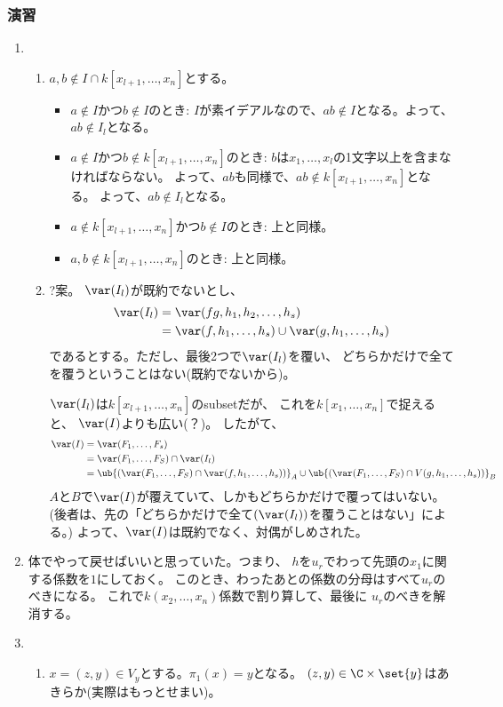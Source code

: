 \subsubsection{演習}
\label{subs:演習}
\begin{enumerate}[label=(\arabic*)]
  \item
  \begin{enumerate}[label=(\alph*)]
    \item
    $a,b \notin I\cap k[x_{l+1},\dots,x_n]$とする。
    \begin{itemize}
      \item $a\notin I$かつ$b\notin I$のとき:
      $I$が素イデアルなので、$ab \notin I$となる。よって、
      $ab \notin I_l$となる。
      \item $a\notin I$かつ$b\notin k[x_{l+1},\dots,x_n]$のとき:
      $b$は$x_1,\dots,x_l$の1文字以上を含まなければならない。
      よって、$ab$も同様で、$ab\notin k[x_{l+1},\dots,x_n]$となる。
      よって、$ab\notin I_l$となる。
      \item $a\notin k[x_{l+1},\dots,x_n]$かつ$b\notin I$のとき:
      上と同様。
      \item $a,b \notin k[x_{l+1},\dots,x_n]$のとき:
      上と同様。
    \end{itemize}
    \item
    ?案。
    $\var(I_l)$が既約でないとし、
    \begin{align}
      \var(I_l) &= \var(fg,h_1,h_2,\dots,h_s)\\
      &=
      \var(f,h_1,\dots,h_s) \cup \var(g,h_1,\dots,h_s)
    \end{align}
    であるとする。ただし、最後2つで$\var(I_l)$を覆い、
    どちらかだけで全てを覆うということはない(既約でないから)。

    $\var(I_l)$は$k[x_{l+1},\dots,x_n]$のsubsetだが、
    これを$k[x_1,\dots,x_n]$で捉えると、
    $\var(I)$よりも広い(？)。
    したがて、
    \begin{align}
      \var(I)
      &=
      \var(F_1,\dots,F_s)\\
      &=
      \var(F_1,\dots,F_S)\cap \var(I_l)\\
      &=
      \ub{(\var(F_1,\dots,F_S)\cap \var(f,h_1,\dots,h_s))}_{A}
      \cup
      \ub{(\var(F_1,\dots,F_S)\cap V(g,h_1,\dots,h_s))}_{B}
    \end{align}
    $A$と$B$で$\var(I)$が覆えていて、しかもどちらかだけで覆ってはいない。
    (後者は、先の「どちらかだけで全て$(\var(I_l))$を覆うことはない」による。)
    よって、$\var(I)$は既約でなく、対偶がしめされた。
  \end{enumerate}
  \item
  体でやって戻せばいいと思っていた。つまり、
  $h$を$u_r$でわって先頭の$x_1$に関する係数を$1$にしておく。
  このとき、わったあとの係数の分母はすべて$u_r$のべきになる。
  これで$k(x_2,\dots,x_n)$係数で割り算して、最後に
  $u_r$のべきを解消する。
  \item
  \begin{enumerate}[label=(\alph*)]
    \item
    $x=(z,y) \in V_y $とする。$\pi_1(x) = y$となる。
    $(z,y)\in \C \times \set{y}$はあきらか(実際はもっとせまい)。


\end{enumerate}
\end{enumerate}
